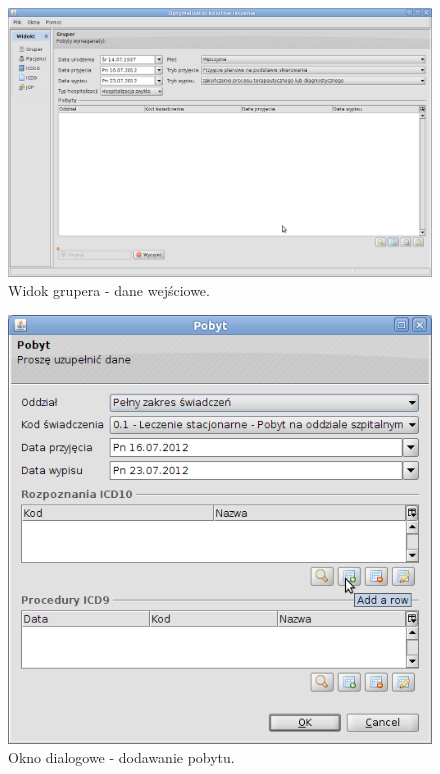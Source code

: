\begin{figure}%
\centering
\includegraphics[scale=0.4]{images/gruper1}
\caption[Widok grupera]{Widok grupera - dane wejściowe.}
\label{img:gruper1}
\end{figure}

\begin{figure}%
\centering
\includegraphics[scale=0.4]{images/gruper2}
\caption[Widok grupera]{Okno dialogowe - dodawanie pobytu.}
\label{img:gruper2}
\end{figure}

